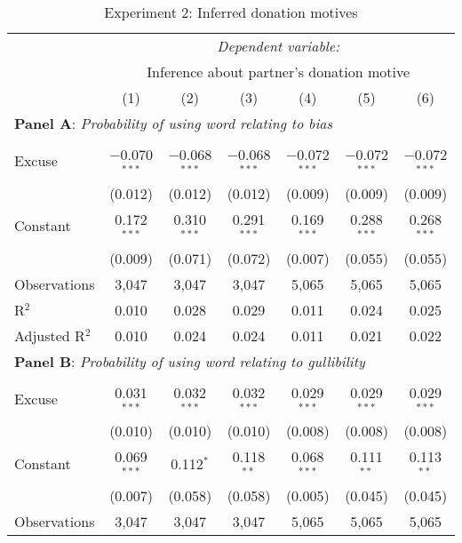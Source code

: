 \begin{table}[!htbp] \centering 
  \caption{Experiment 2: Inferred donation motives}
  \label{t:1-word}
\begin{threeparttable}
\begin{tabular}{@{\hspace{5pt}}l@{\hspace{5pt}}cccccc} 
\toprule 
 & \multicolumn{6}{c}{\textit{Dependent variable:}} \\ 
\cmidrule(rr){2-7} 
 & \multicolumn{6}{c}{Inference about partner's donation motive} \\ 
 & (1) & (2) & (3) & (4) & (5) & (6)\\ 
\midrule  
\midrule
\multicolumn{7}{l}{\textbf{Panel A}: \textit{Probability of using word relating to bias}} \\
\midrule
\\[-2.1ex] Excuse & $-$0.070$^{***}$ & $-$0.068$^{***}$ & $-$0.068$^{***}$ & $-$0.072$^{***}$ & $-$0.072$^{***}$ & $-$0.072$^{***}$ \\ 
  & (0.012) & (0.012) & (0.012) & (0.009) & (0.009) & (0.009) \\ 
 \addlinespace 
 Constant & 0.172$^{***}$ & 0.310$^{***}$ & 0.291$^{***}$ & 0.169$^{***}$ & 0.288$^{***}$ & 0.268$^{***}$ \\ 
  & (0.009) & (0.071) & (0.072) & (0.007) & (0.055) & (0.055) \\ 
 \addlinespace 
\midrule  
Observations & 3,047 & 3,047 & 3,047 & 5,065 & 5,065 & 5,065 \\ 
R$^{2}$ & 0.010 & 0.028 & 0.029 & 0.011 & 0.024 & 0.025 \\ 
Adjusted R$^{2}$ & 0.010 & 0.024 & 0.024 & 0.011 & 0.021 & 0.022 \\ 
\midrule
\midrule
\multicolumn{7}{l}{\textbf{Panel B}: \textit{Probability of using word relating to gullibility}} \\
\midrule
\\[-2.1ex] Excuse & 0.031$^{***}$ & 0.032$^{***}$ & 0.032$^{***}$ & 0.029$^{***}$ & 0.029$^{***}$ & 0.029$^{***}$ \\ 
  & (0.010) & (0.010) & (0.010) & (0.008) & (0.008) & (0.008) \\ 
 \addlinespace 
 Constant & 0.069$^{***}$ & 0.112$^{*}$ & 0.118$^{**}$ & 0.068$^{***}$ & 0.111$^{**}$ & 0.113$^{**}$ \\ 
  & (0.007) & (0.058) & (0.058) & (0.005) & (0.045) & (0.045) \\ 
 \addlinespace 
\midrule  
Observations & 3,047 & 3,047 & 3,047 & 5,065 & 5,065 & 5,065 \\ 

\end{tabular}
\end{threeparttable}
\end{table}
